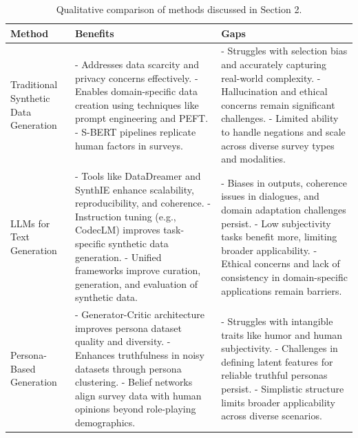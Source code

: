 \documentclass[11pt]{article}
\begin{document}
\begin{table}[ht]
    \centering
    \begin{tabular}{|p{4cm}|p{6cm}|p{6cm}|} \hline  
         \textbf{Method} & \textbf{Benefits} & \textbf{Gaps} \\ \hline  
         
         Traditional Synthetic Data Generation & 
         - Addresses data scarcity and privacy concerns effectively. \newline
         - Enables domain-specific data creation using techniques like prompt engineering and PEFT. \newline
         - S-BERT pipelines replicate human factors in surveys. & 
         - Struggles with selection bias and accurately capturing real-world complexity. \newline
         - Hallucination and ethical concerns remain significant challenges. \newline
         - Limited ability to handle negations and scale across diverse survey types and modalities. \\ \hline  
         
         LLMs for Text Generation & 
         - Tools like DataDreamer and SynthIE enhance scalability, reproducibility, and coherence. \newline
         - Instruction tuning (e.g., CodecLM) improves task-specific synthetic data generation. \newline
         - Unified frameworks improve curation, generation, and evaluation of synthetic data. & 
         - Biases in outputs, coherence issues in dialogues, and domain adaptation challenges persist. \newline
         - Low subjectivity tasks benefit more, limiting broader applicability. \newline
         - Ethical concerns and lack of consistency in domain-specific applications remain barriers. \\ \hline  
         
         Persona-Based Generation & 
         - Generator-Critic architecture improves persona dataset quality and diversity. \newline
         - Enhances truthfulness in noisy datasets through persona clustering. \newline
         - Belief networks align survey data with human opinions beyond role-playing demographics. & 
         - Struggles with intangible traits like humor and human subjectivity. \newline
         - Challenges in defining latent features for reliable truthful personas persist. \newline
         - Simplistic structure limits broader applicability across diverse scenarios. \\ \hline  
    \end{tabular}
    \caption{Qualitative comparison of methods discussed in Section 2.}
    \label{tab:comparison}
\end{table}
\end{document}
